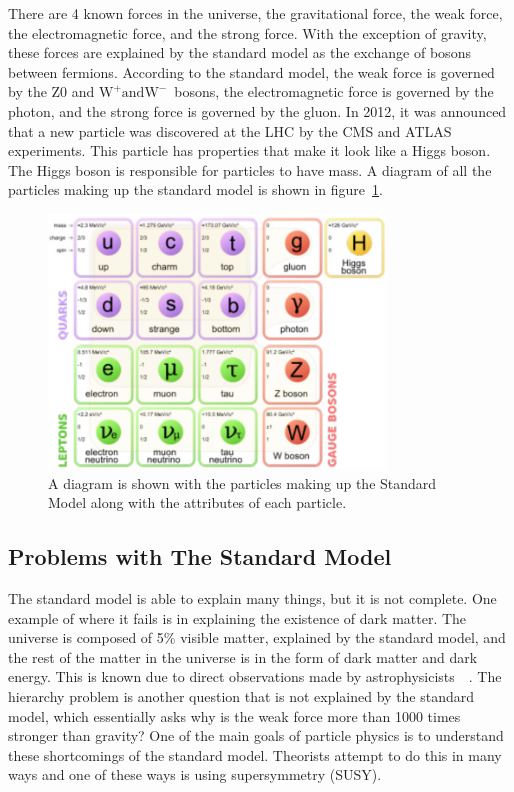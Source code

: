 There are 4 known forces in the universe, the gravitational force, the weak force, the electromagnetic force, and the strong force.
With the exception of gravity, these forces are explained by the standard model as the exchange of bosons between fermions.
According to the standard model, the weak force is governed by the Z0 and $\mathrm{W^{+} and W^{-}}$~bosons,
the electromagnetic force is governed by the photon, and the strong force is governed by the gluon.
In 2012, it was announced that a new particle was discovered at the LHC by the CMS and ATLAS experiments.
This particle has properties that make it look like a Higgs boson.
The Higgs boson is responsible for particles to have mass.
A diagram of all the particles making up the standard model is shown in figure~\ref{fig:SM}.

\begin{figure}[!htb]
  \begin{center}
    \includegraphics[width=0.8\textwidth]{intro/figs/Standard_Model_of_Elementary_Particles.pdf}
    \caption{
      \label{fig:SM}
      A diagram is shown with the particles making up the Standard Model along with the attributes of each particle.
    }
  \end{center}
\end{figure}

\subsection{Problems with The Standard Model}
The standard model is able to explain many things, but it is not complete.
One example of where it fails is in explaining the existence of dark matter.
The universe is composed of 5\% visible matter, explained by the standard model,
and the rest of the matter in the universe is in the form of dark matter and dark energy.
This is known due to direct observations made by astrophysicists~\cite{darkmatter}~\cite{Bertone:2004pz}.
The hierarchy problem is another question that is not explained by the standard model,
which essentially asks why is the weak force more than 1000 times stronger than gravity?
One of the main goals of particle physics is to understand these shortcomings of the standard model.
Theorists attempt to do this in many ways and one of these ways is using supersymmetry (SUSY).

